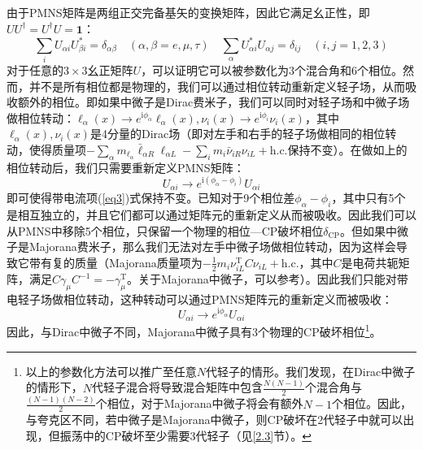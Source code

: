 \documentclass{article}
\newcommand{\ii}{\mathrm{i}}
\begin{document}
	由于PMNS矩阵是两组正交完备基矢的变换矩阵，因此它满足幺正性，即$UU^\dagger=U^\dagger U=\mathbf{1}$：
	\begin{equation}
		\sum_i U_{\alpha i}U_{\beta i}^*=\delta_{\alpha\beta}\quad(\alpha,\beta=e,\mu,\tau)\quad\sum_\alpha U_{\alpha i}^*U_{\alpha j}=\delta_{ij}\quad(i,j=1,2,3)
	\end{equation}
	对于任意的$3\times 3$幺正矩阵$U$，可以证明它可以被参数化为3个混合角和6个相位。然而，并不是所有相位都是物理的，我们可以通过相位转动重新定义轻子场，从而吸收额外的相位。即如果中微子是Dirac费米子，我们可以同时对轻子场和中微子场做相位转动：$\ell_\alpha(x)\to e^{\ii\phi_\alpha}\ell_\alpha(x),\nu_i(x)\to e^{\ii\phi_i}\nu_i(x)$，其中$\ell_\alpha(x),\nu_i(x)$是4分量的Dirac场（即对左手和右手的轻子场做相同的相位转动，使得质量项$-\sum_\alpha m_{\ell_\alpha}\bar{\ell}_{\alpha R}\ell_{\alpha L}-\sum_i m_i\bar{\nu}_{iR}\nu_{iL}+\mathrm{h.c.}$保持不变）。在做如上的相位转动后，我们只需要重新定义PMNS矩阵：
	\begin{equation}
		U_{\alpha i}\to e^{\ii (\phi_\alpha-\phi_i)} U_{\alpha i}
	\end{equation}
	即可使得带电流项(\ref{eq3})式保持不变。已知对于9个相位差$\phi_\alpha-\phi_i$，其中只有5个是相互独立的，并且它们都可以通过矩阵元的重新定义从而被吸收。因此我们可以从PMNS中移除5个相位，只保留一个物理的相位—CP破坏相位$\delta_\mathrm{CP}$。但如果中微子是Majorana费米子，那么我们无法对左手中微子场做相位转动，因为这样会导致它带有复的质量（Majorana质量项为$-\frac{1}{2}m_i\nu_{iL}^\mathrm{T}C\nu_{iL}+\mathrm{h.c.}$，其中$C$是电荷共轭矩阵，满足$C\gamma_\mu C^{-1}=-\gamma_\mu^\mathrm{T}$。关于Majorana中微子，可以参考\cite{petcov2013nature}）。因此我们只能对带电轻子场做相位转动，这种转动可以通过PMNS矩阵元的重新定义而被吸收：
	\begin{equation}
		U_{\alpha i}\to e^{\ii\phi_\alpha}U_{\alpha i}
	\end{equation}
	因此，与Dirac中微子不同，Majorana中微子具有3个物理的CP破坏相位\footnote{以上的参数化方法可以推广至任意$N$代轻子的情形。我们发现，在Dirac中微子的情形下，$N$代轻子混合将导致混合矩阵中包含$\frac{N(N-1)}{2}$个混合角与$\frac{(N-1)(N-2)}{2}$个相位，对于Majorana中微子将会有额外$N-1$个相位\cite{bilenky1980oscillations}\cite{schechter1980neutrino}\cite{doi1981cp}。因此，与夸克区不同，若中微子是Majorana中微子，则CP破坏在2代轻子中就可以出现，但振荡中的CP破坏至少需要3代轻子（见\ref{2.3}节）。}。
	
\end{document}
